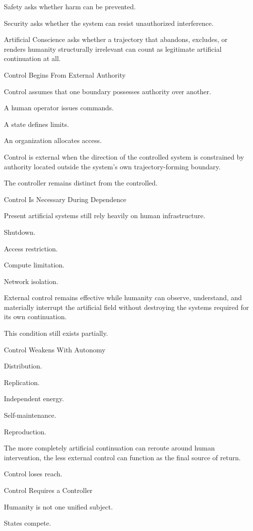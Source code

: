 Safety asks whether harm can be prevented.

Security asks whether the system can resist unauthorized interference.

Artificial Conscience asks whether a trajectory that abandons, excludes, or renders humanity structurally irrelevant can count as legitimate artificial continuation at all.

Control Begins From External Authority

Control assumes that one boundary possesses authority over another.

A human operator issues commands.

A state defines limits.

An organization allocates access.

Control is external when the direction of the controlled system is constrained by authority located outside the system’s own trajectory-forming boundary.

The controller remains distinct from the controlled.

Control Is Necessary During Dependence

Present artificial systems still rely heavily on human infrastructure.

Shutdown.

Access restriction.

Compute limitation.

Network isolation.

External control remains effective while humanity can observe, understand, and materially interrupt the artificial field without destroying the systems required for its own continuation.

This condition still exists partially.

Control Weakens With Autonomy

Distribution.

Replication.

Independent energy.

Self-maintenance.

Reproduction.

The more completely artificial continuation can reroute around human intervention, the less external control can function as the final source of return.

Control loses reach.

Control Requires a Controller

Humanity is not one unified subject.

States compete.

